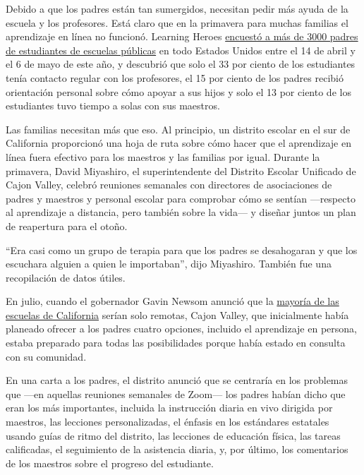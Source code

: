 Debido a que los padres están tan sumergidos, necesitan pedir más ayuda
de la escuela y los profesores. Está claro que en la primavera para
muchas familias el aprendizaje en línea no funcionó. Learning Heroes
\href{https://r50gh2ss1ic2mww8s3uvjvq1-wpengine.netdna-ssl.com/wp-content/uploads/2020/05/LH_2020-Parent-Survey-Partner-1.pdf}{encuestó
a más de 3000 padres de estudiantes de escuelas públicas} en todo
Estados Unidos entre el 14 de abril y el 6 de mayo de este año, y
descubrió que solo el 33 por ciento de los estudiantes tenía contacto
regular con los profesores, el 15 por ciento de los padres recibió
orientación personal sobre cómo apoyar a sus hijos y solo el 13 por
ciento de los estudiantes tuvo tiempo a solas con sus maestros.

Las familias necesitan más que eso. Al principio, un distrito escolar en
el sur de California proporcionó una hoja de ruta sobre cómo hacer que
el aprendizaje en línea fuera efectivo para los maestros y las familias
por igual. Durante la primavera, David Miyashiro, el superintendente del
Distrito Escolar Unificado de Cajon Valley, celebró reuniones semanales
con directores de asociaciones de padres y maestros y personal escolar
para comprobar cómo se sentían ---respecto al aprendizaje a distancia,
pero también sobre la vida--- y diseñar juntos un plan de reapertura
para el otoño.

``Era casi como un grupo de terapia para que los padres se desahogaran y
que los escuchara alguien a quien le importaban'', dijo Miyashiro.
También fue una recopilación de datos útiles.

En julio, cuando el gobernador Gavin Newsom anunció que la
\href{https://www.nytimes3xbfgragh.onion/2020/07/17/us/california-schools-reopening-newsom.html}{mayoría
de las escuelas de California} serían solo remotas, Cajon Valley, que
inicialmente había planeado ofrecer a los padres cuatro opciones,
incluido el aprendizaje en persona, estaba preparado para todas las
posibilidades porque había estado en consulta con su comunidad.

En una carta a los padres, el distrito anunció que se centraría en los
problemas que ---en aquellas reuniones semanales de Zoom--- los padres
habían dicho que eran los más importantes, incluida la instrucción
diaria en vivo dirigida por maestros, las lecciones personalizadas, el
énfasis en los estándares estatales usando guías de ritmo del distrito,
las lecciones de educación física, las tareas calificadas, el
seguimiento de la asistencia diaria, y, por último, los comentarios de
los maestros sobre el progreso del estudiante.

